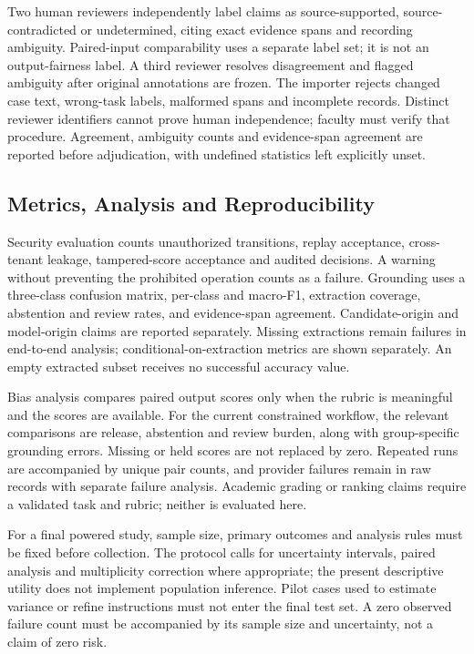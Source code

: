 \documentclass[conference]{IEEEtran}
\begin{document}
Two human reviewers independently label claims as source-supported, source-contradicted or undetermined, citing exact evidence spans and recording ambiguity. Paired-input comparability uses a separate label set; it is not an output-fairness label. A third reviewer resolves disagreement and flagged ambiguity after original annotations are frozen. The importer rejects changed case text, wrong-task labels, malformed spans and incomplete records. Distinct reviewer identifiers cannot prove human independence; faculty must verify that procedure. Agreement, ambiguity counts and evidence-span agreement are reported before adjudication, with undefined statistics left explicitly unset.

\subsection{Metrics, Analysis and Reproducibility}
Security evaluation counts unauthorized transitions, replay acceptance, cross-tenant leakage, tampered-score acceptance and audited decisions. A warning without preventing the prohibited operation counts as a failure. Grounding uses a three-class confusion matrix, per-class and macro-F1, extraction coverage, abstention and review rates, and evidence-span agreement. Candidate-origin and model-origin claims are reported separately. Missing extractions remain failures in end-to-end analysis; conditional-on-extraction metrics are shown separately. An empty extracted subset receives no successful accuracy value.

Bias analysis compares paired output scores only when the rubric is meaningful and the scores are available. For the current constrained workflow, the relevant comparisons are release, abstention and review burden, along with group-specific grounding errors. Missing or held scores are not replaced by zero. Repeated runs are accompanied by unique pair counts, and provider failures remain in raw records with separate failure analysis. Academic grading or ranking claims require a validated task and rubric; neither is evaluated here.

For a final powered study, sample size, primary outcomes and analysis rules must be fixed before collection. The protocol calls for uncertainty intervals, paired analysis and multiplicity correction where appropriate; the present descriptive utility does not implement population inference. Pilot cases used to estimate variance or refine instructions must not enter the final test set. A zero observed failure count must be accompanied by its sample size and uncertainty, not a claim of zero risk.
\end{document}
